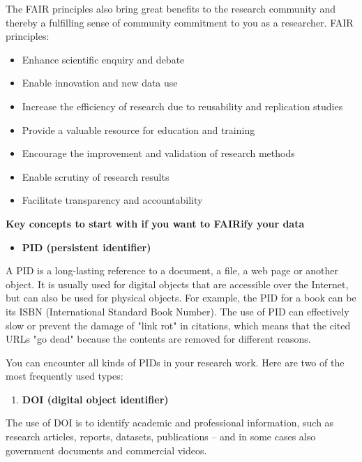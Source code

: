 \documentclass[
]{book}
\providecommand{\tightlist}{%
  \setlength{\itemsep}{0pt}\setlength{\parskip}{0pt}}
\begin{document}
The FAIR principles also bring great benefits to the research community and thereby a fulfilling sense of community commitment to you as a researcher. FAIR principles:

\begin{itemize}
\tightlist
\item
  Enhance scientific enquiry and debate
\item
  Enable innovation and new data use
\item
  Increase the efficiency of research due to reusability and replication studies
\item
  Provide a valuable resource for education and training
\item
  Encourage the improvement and validation of research methods
\item
  Enable scrutiny of research results
\item
  Facilitate transparency and accountability
\end{itemize}

\textbf{Key concepts to start with if you want to FAIRify your data}

\begin{itemize}
\tightlist
\item
  \textbf{PID (persistent identifier)}
\end{itemize}

A PID is a long-lasting reference to a document, a file, a web page or another object. It is usually used for digital objects that are accessible over the Internet, but can also be used for physical objects. For example, the PID for a book can be its ISBN (International Standard Book Number). The use of PID can effectively slow or prevent the damage of "link rot" in citations, which means that the cited URLs "go dead" because the contents are removed for different reasons.

You can encounter all kinds of PIDs in your research work. Here are two of the most frequently used types:

\begin{enumerate}
\def\labelenumi{\arabic{enumi}.}
\tightlist
\item
  \textbf{DOI (digital object identifier)}
\end{enumerate}

The use of DOI is to identify academic and professional information, such as research articles, reports, datasets, publications -- and in some cases also government documents and commercial videos.
\end{document}
